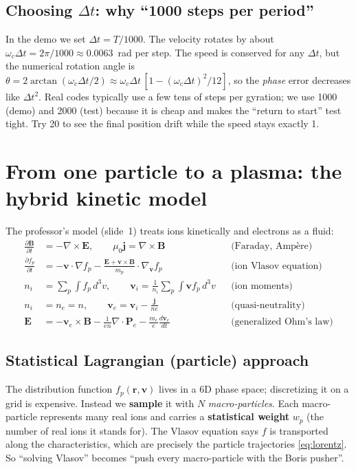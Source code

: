 \documentclass[11pt,a4paper]{article}
\newcommand{\vv}{\mathbf{v}}
\newcommand{\EE}{\mathbf{E}}
\newcommand{\BB}{\mathbf{B}}
\begin{document}
\subsection{Choosing $\Delta t$: why ``1000 steps per period''}
In the demo we set $\Delta t = T/1000$. The velocity rotates by about
$\omega_c\Delta t=2\pi/1000\approx0.0063$~rad per step. The speed is conserved for any
$\Delta t$, but the numerical rotation angle is $\theta=2\arctan(\omega_c\Delta t/2)
\approx\omega_c\Delta t\,[1-(\omega_c\Delta t)^2/12]$, so the \emph{phase} error decreases
like $\Delta t^2$. Real codes typically use a few tens of steps per gyration; we use 1000
(demo) and 2000 (test) because it is cheap and makes the ``return to start'' test tight.
Try 20 to see the final position drift while the speed stays exactly 1.

\section{From one particle to a plasma: the hybrid kinetic model}

The professor's model (slide~1) treats ions kinetically and electrons as a fluid:
\begin{align}
  \frac{\partial \BB}{\partial t}&=-\nabla\times\EE, \qquad \mu_0\mathbf j=\nabla\times\BB
    &&\text{(Faraday, Amp\`ere)}\\
  \frac{\partial f_p}{\partial t}&=-\vv\cdot\nabla f_p-\frac{\EE+\vv\times\BB}{m_p}\cdot\nabla_{\vv}f_p
    &&\text{(ion Vlasov equation)}\\
  n_i&=\sum_p\!\int f_p\,d^3v,\qquad
  \vv_i=\frac{1}{n_i}\sum_p\!\int\vv f_p\,d^3v &&\text{(ion moments)}\\
  n_i&=n_e=n,\qquad \vv_e=\vv_i-\frac{\mathbf j}{ne} &&\text{(quasi-neutrality)}\\
  \EE&=-\vv_e\times\BB-\frac{1}{en}\nabla\!\cdot\!\mathbf P_e-\frac{m_e}{e}\frac{d\vv_e}{dt}
    &&\text{(generalized Ohm's law)}
\end{align}

\subsection{Statistical Lagrangian (particle) approach}
The distribution function $f_p(\mathbf r,\vv)$ lives in a 6D phase space; discretizing it on a
grid is expensive. Instead we \textbf{sample} it with $N$ \emph{macro-particles}. Each
macro-particle represents many real ions and carries a \textbf{statistical weight} $w_p$
(the number of real ions it stands for). The Vlasov equation says $f$ is transported along
the characteristics, which are precisely the particle trajectories \eqref{eq:lorentz}. So
``solving Vlasov'' becomes ``push every macro-particle with the Boris pusher''.
\end{document}
